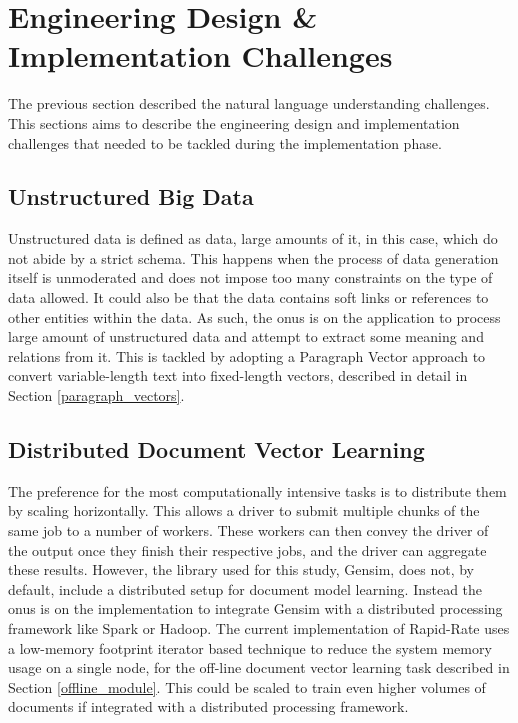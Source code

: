 \documentclass[conference]{IEEEtran}
\begin{document}
\vspace{5mm}

\section{Engineering Design \& Implementation Challenges}
    The previous section described the natural language understanding challenges. This sections aims to describe the engineering design and implementation challenges that needed to be tackled during the implementation phase.

    \subsection{Unstructured Big Data}
        Unstructured data is defined as data, large amounts of it, in this case, which do not abide by a strict schema\cite{buneman1996query}. 
        This happens when the process of data generation itself is unmoderated and does not impose too many constraints on the type of data allowed. 
        It could also be that the data contains soft links or references to other entities within the data. 
        As such, the onus is on the application to process large amount of unstructured data and attempt to extract some meaning and relations from it.
        This is tackled by adopting a Paragraph Vector approach to convert variable-length text into fixed-length vectors, described in detail in Section \ref{paragraph_vectors}.

    \subsection{Distributed Document Vector Learning} \label{dist_docvec_learning}
        The preference for the most computationally intensive tasks is to distribute them by scaling horizontally.
        This allows a driver to submit multiple chunks of the same job to a number of workers.
        These workers can then convey the driver of the output once they finish their respective jobs, and the driver can aggregate these results.
        However, the library used for this study, Gensim, does not, by default, include a distributed setup for document model learning.
        Instead the onus is on the implementation to integrate Gensim with a distributed processing framework like Spark or Hadoop.
        The current implementation of Rapid-Rate uses a low-memory footprint iterator based technique to reduce the system memory usage on a single node, for the off-line document vector learning task described in Section \ref{offline_module}.
        This could be scaled to train even higher volumes of documents if integrated with a distributed processing framework.
\end{document}
